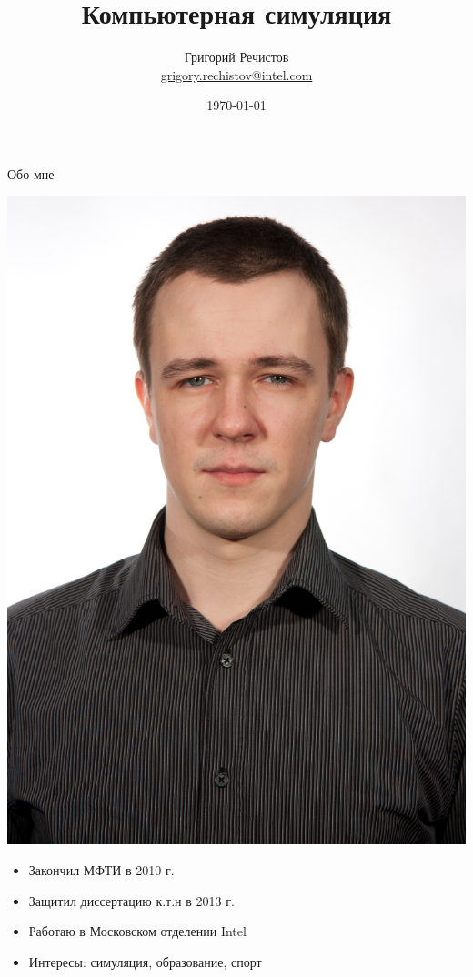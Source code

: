 \documentclass{beamer}
\title{Компьютерная симуляция }
\author[Григорий Речистов]{Григорий Речистов \\ \small{\href{mailto:grigory.rechistov@intel.com}{grigory.rechistov@intel.com}}}
\date{\today}
\begin{document}
\begin{frame}
\titlepage
\end{frame}

\begin{frame}
\tableofcontents
\end{frame} 

\begin{frame}{Обо мне}

\raggedleft \includegraphics[height=0.3\textheight]{./grigory-rechistov}

\begin{itemize}
\item Закончил МФТИ в 2010 г.
\item Защитил диссертацию к.т.н в 2013 г.
\item Работаю в Московском отделении Intel 
\item Интересы: симуляция, образование, спорт

\end{itemize}


\end{frame} 
\end{document}

